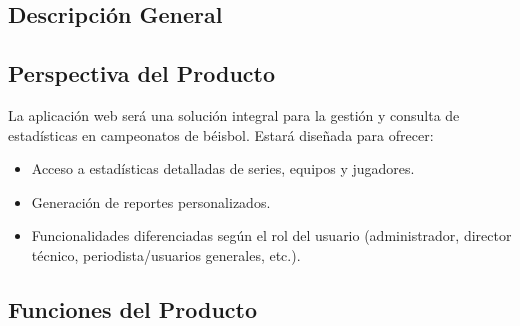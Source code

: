 \documentclass{report}
\begin{document}
    \newpage

    \begin{center}
        \section*{Descripción General}
    \end{center}

        \subsection*{Perspectiva del Producto}
        La aplicación web será una solución integral para la gestión y consulta de estadísticas en campeonatos de 
        béisbol. Estará diseñada para ofrecer:
        \begin{itemize}
            \item Acceso a estadísticas detalladas de series, equipos y jugadores.
            \item Generación de reportes personalizados.
            \item Funcionalidades diferenciadas según el rol del usuario (administrador, director técnico, 
            periodista/usuarios generales, etc.).
        \end{itemize}

        \subsection*{Funciones del Producto}
        
\end{document}
